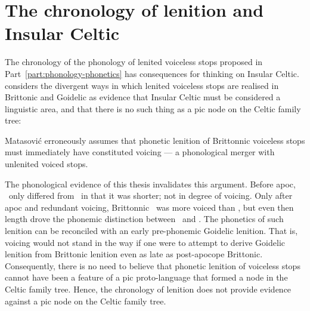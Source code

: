 \section{The chronology of lenition and Insular Celtic}
\label{sec:cons-other-rese-1}
The chronology of the phonology of lenited voiceless stops proposed in Part~\ref{part:phonology-phonetics} has consequences for thinking on Insular Celtic. \Textcite{matasovic_insular_2008} considers the divergent ways in which lenited voiceless stops are realised in Brittonic and Goidelic as evidence that Insular Celtic must be considered  a linguistic area, and that there is no such thing as a \gls{pic} node on the Celtic family tree:

Matasović erroneously assumes that phonetic lenition of Brittonnic  voiceless stops must immediately have constituted voicing --- a phonological merger with unlenited voiced stops.

The phonological evidence of this thesis invalidates this argument. Before \gls{apoc}, \lT\ only differed from \xT\ in that it was shorter; not in degree of voicing. Only after \gls{apoc} and redundant voicing, Brittonnic  \lT\ was more voiced than \xT, but even then length drove the phonemic distinction between \xT\ and \lT. The phonetics of such lenition can be reconciled with an early pre-phonemic Goidelic lenition. That is, voicing would not stand in the way if one were to attempt to derive Goidelic lenition from Brittonic lenition even as late as post-apocope Brittonic. Consequently, there is no need to believe  that phonetic lenition of voiceless stops cannot have been a feature of a \gls{pic} proto-language that formed a node in the Celtic family tree. Hence, the chronology of lenition does not provide evidence against a \gls{pic} node on the Celtic family tree.

